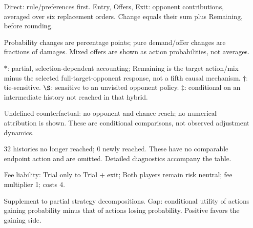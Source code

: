 \documentclass[10pt]{article}
\begin{document}
{\footnotesize Direct: rule/preferences first. Entry, Offers, Exit: opponent contributions, averaged over six replacement orders. Change equals their sum plus Remaining, before rounding.\par
Probability changes are percentage points; pure demand/offer changes are fractions of damages. Mixed offers are shown as action probabilities, not averages.\par
$*$: partial, selection-dependent accounting; Remaining is the target action/mix minus the selected full-target-opponent response, not a fifth causal mechanism. $\dagger$: tie-sensitive. $\S$: sensitive to an unvisited opponent policy. $\ddagger$: conditional on an intermediate history not reached in that hybrid.\par
Undefined counterfactual: no opponent-and-chance reach; no numerical attribution is shown. These are conditional comparisons, not observed adjustment dynamics.\par
32 histories no longer reached; 0 newly reached. These have no comparable endpoint action and are omitted. Detailed diagnostics accompany the table.}\par
{}\par
Fee liability: Trial only to Trial + exit; Both players remain risk neutral; fee multiplier 1; costs 4.\par
{\small Supplement to partial strategy decompositions. Gap: conditional utility of actions gaining probability minus that of actions losing probability. Positive favors the gaining side.}\par
\end{document}
